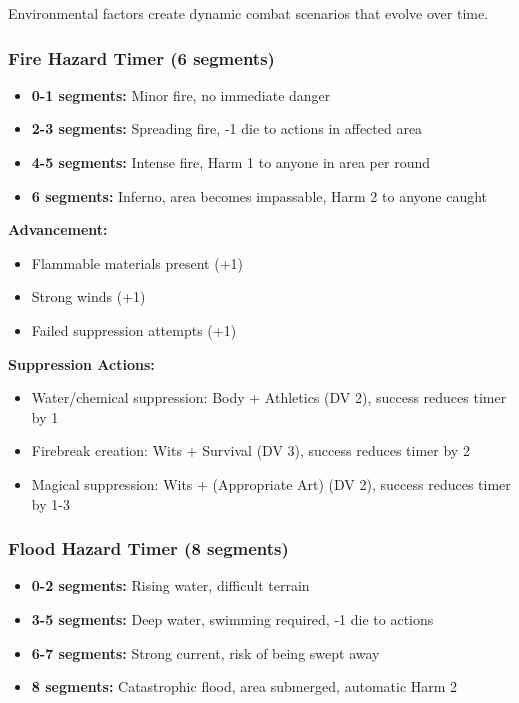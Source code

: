\documentclass[11pt,letterpaper]{article}
\begin{document}
Environmental factors create dynamic combat scenarios that evolve over time.

\subsubsection{Fire Hazard Timer (6 segments)}

\begin{itemize}[leftmargin=*]
    \item \textbf{0-1 segments:} Minor fire, no immediate danger
    \item \textbf{2-3 segments:} Spreading fire, -1 die to actions in affected area
    \item \textbf{4-5 segments:} Intense fire, Harm 1 to anyone in area per round
    \item \textbf{6 segments:} Inferno, area becomes impassable, Harm 2 to anyone caught
\end{itemize}

\textbf{Advancement:}
\begin{itemize}[leftmargin=*]
    \item Flammable materials present (+1)
    \item Strong winds (+1)
    \item Failed suppression attempts (+1)
\end{itemize}

\textbf{Suppression Actions:}
\begin{itemize}[leftmargin=*]
    \item Water/chemical suppression: Body + Athletics (DV 2), success reduces timer by 1
    \item Firebreak creation: Wits + Survival (DV 3), success reduces timer by 2
    \item Magical suppression: Wits + (Appropriate Art) (DV 2), success reduces timer by 1-3
\end{itemize}

\subsubsection{Flood Hazard Timer (8 segments)}

\begin{itemize}[leftmargin=*]
    \item \textbf{0-2 segments:} Rising water, difficult terrain
    \item \textbf{3-5 segments:} Deep water, swimming required, -1 die to actions
    \item \textbf{6-7 segments:} Strong current, risk of being swept away
    \item \textbf{8 segments:} Catastrophic flood, area submerged, automatic Harm 2
\end{itemize}
\end{document}
